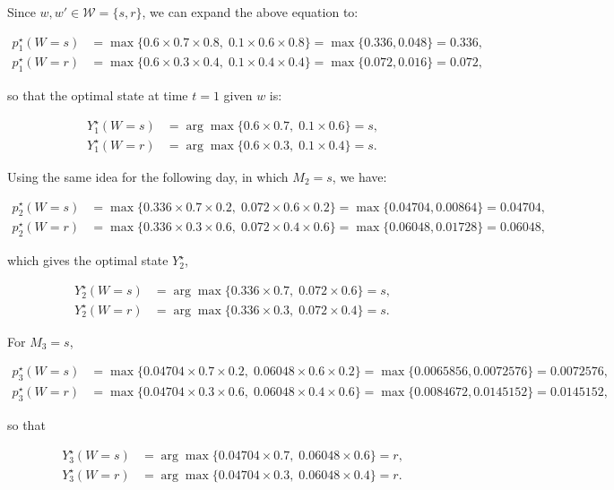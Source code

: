 Since $w,w' \in \mathcal{W}=\{s,r\}$, we can expand the above equation to:

\[
\begin{aligned}
p^\star_1(W=s)&=\max\bigl\{0.6\times0.7\times0.8,\;0.1\times0.6\times0.8\bigr\}
                =\max\{0.336,0.048\}=0.336,\\
p^\star_1(W=r)&=\max\bigl\{0.6\times0.3\times0.4,\;0.1\times0.4\times0.4\bigr\}
                =\max\{0.072,0.016\}=0.072,
\end{aligned}
\]

so that the optimal state at time $t=1$ given $w$ is:

\[
\begin{aligned}
Y^\star_1(W=s) &= \arg\max\{0.6\times0.7,\;0.1\times0.6\}=s,\\
Y^\star_1(W=r) &= \arg\max\{0.6\times0.3,\;0.1\times0.4\}=s.
\end{aligned}
\]

Using the same idea for the following day, in which $M_2=s$, we have:

\[
\begin{aligned}
p^\star_2(W=s)&=\max\bigl\{0.336\times0.7\times0.2,\;0.072\times0.6\times0.2\bigr\}
               =\max\{0.04704,0.00864\}=0.04704,\\
p^\star_2(W=r)&=\max\bigl\{0.336\times0.3\times0.6,\;0.072\times0.4\times0.6\bigr\}
               =\max\{0.06048,0.01728\}=0.06048,
\end{aligned}
\]

which gives the optimal state $Y^\star_2$,

\[
\begin{aligned}
Y^\star_2(W=s) &= \arg\max\{0.336\times0.7,\;0.072\times0.6\}=s,\\
Y^\star_2(W=r) &= \arg\max\{0.336\times0.3,\;0.072\times0.4\}=s.
\end{aligned}
\]

For $M_3=s$,

\[
\begin{aligned}
p^\star_3(W=s)&=\max\bigl\{0.04704\times0.7\times0.2,\;0.06048\times0.6\times0.2\bigr\}
               =\max\{0.0065856,0.0072576\}=0.0072576,\\
p^\star_3(W=r)&=\max\bigl\{0.04704\times0.3\times0.6,\;0.06048\times0.4\times0.6\bigr\}
               =\max\{0.0084672,0.0145152\}=0.0145152,
\end{aligned}
\]

so that

\[
\begin{aligned}
Y^\star_3(W=s)&=\arg\max\{0.04704\times0.7,\;0.06048\times0.6\}=r,\\
Y^\star_3(W=r)&=\arg\max\{0.04704\times0.3,\;0.06048\times0.4\}=r.
\end{aligned}
\]

